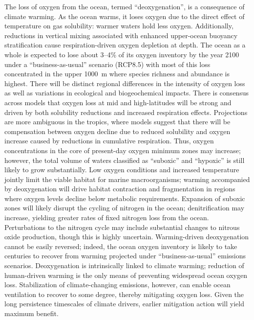\documentclass[draft,linenumbers]{report_chapter}
\begin{document}
The loss of oxygen from the ocean, termed ``deoxygenation'', is a consequence of climate warming.
As the ocean warms, it loses oxygen due to the direct effect of temperature on gas solubility: warmer waters hold less oxygen.
Additionally, reductions in vertical mixing associated with enhanced upper-ocean buoyancy stratification cause respiration-driven oxygen depletion at depth.
The ocean as a whole is expected to lose about 3--4\% of its oxygen inventory by the year 2100 under a ``business-as-usual'' scenario (RCP8.5) with most of this loss concentrated in the upper 1000~m where species richness and abundance is highest.
There will be distinct regional differences in the intensity of oxygen loss as well as variations in ecological and biogeochemical impacts.
There is consensus across models that oxygen loss at mid and high-latitudes will be strong and driven by both solubility reductions and increased respiration effects.
Projections are more ambiguous in the tropics, where models suggest that there will be compensation between oxygen decline due to reduced solubility and oxygen increase caused by reductions in cumulative respiration.
Thus, oxygen concentrations in the core of present-day oxygen minimum zones may increase; however, the total volume of waters classified as ``suboxic'' and ``hypoxic'' is still likely to grow substantially.
Low oxygen conditions and increased temperature jointly limit the viable habitat for marine macroorganisms; warming accompanied by deoxygenation will drive habitat contraction and fragmentation in regions where oxygen levels decline below metabolic requirements.
Expansion of suboxic zones will likely disrupt the cycling of nitrogen in the ocean; denitrification may increase, yielding greater rates of fixed nitrogen loss from the ocean.
Perturbations to the nitrogen cycle may include substantial changes to nitrous oxide production, though this is highly uncertain.
Warming-driven deoxygenation cannot be easily reversed; indeed, the ocean oxygen inventory is likely to take centuries to recover from warming projected under ``business-as-usual'' emissions scenarios.
Deoxygenation is intrinsically linked to climate warming; reduction of human-driven warming is the only means of preventing widespread ocean oxygen loss.
Stabilization of climate-changing emissions, however, can enable ocean ventilation to recover to some degree, thereby mitigating oxygen loss.
Given the long persistence timescales of climate drivers, earlier mitigation action will yield maximum benefit.

\end{document}
